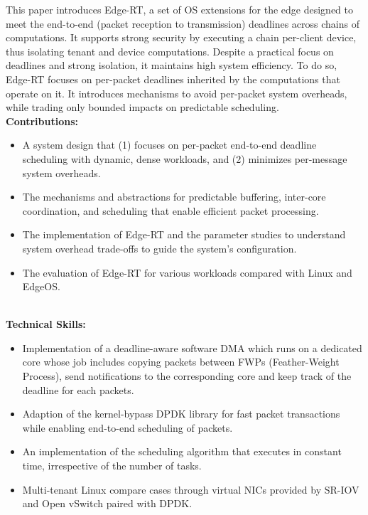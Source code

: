 This paper introduces Edge-RT, a set of OS extensions for the edge designed to meet the end-to-end (packet reception to transmission) deadlines across chains of computations.
It supports strong security by executing a chain per-client device, thus isolating tenant and device computations.
Despite a practical focus on deadlines and strong isolation, it maintains high system efficiency.
To do so, Edge-RT focuses on per-packet deadlines inherited by the computations that operate on it.
It introduces mechanisms to avoid per-packet system overheads, while trading only bounded impacts on predictable scheduling.
\\
\textbf{\small Contributions:}
\begin{itemize}[leftmargin=*]
  \setlength\itemsep{-0.0em}
        \item A system design that (1) focuses on per-packet end-to-end deadline scheduling with dynamic, dense workloads, and (2) minimizes per-message system overheads.
        \item The mechanisms and abstractions for predictable buffering, inter-core coordination, and scheduling that enable efficient packet processing.
        \item The implementation of Edge-RT and the parameter studies to understand system overhead trade-offs to guide the
system’s configuration.
        \item The evaluation of Edge-RT for various workloads compared with Linux and EdgeOS.
\end{itemize}
\vspace{-1.0em}
\
\\
\textbf{\small Technical Skills:}
\begin{itemize}[leftmargin=*]
   \setlength\itemsep{-0.0em}
   	\item Implementation of a deadline-aware software DMA which runs on a dedicated core whose job includes copying packets between FWPs (Feather-Weight Process), send notifications to the corresponding core and keep track of the deadline for each packets.
   	\item Adaption of the kernel-bypass DPDK library for fast packet transactions while enabling end-to-end scheduling of packets.
	\item An implementation of the scheduling algorithm that executes in constant time, irrespective of the number of tasks.
	\item Multi-tenant Linux compare cases through virtual NICs provided by SR-IOV and Open vSwitch paired with DPDK.
\end{itemize}
